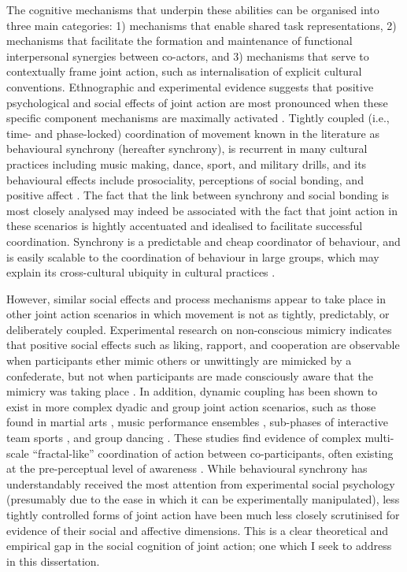 \begin{CJK}{UTF8}{gbsn}
{The cognitive mechanisms that underpin these abilities can be organised into three main categories: 1) mechanisms that enable shared task representations, 2) mechanisms that facilitate the formation and maintenance of functional interpersonal synergies between co-actors, and 3) mechanisms that serve to contextually frame joint action, such as internalisation of explicit cultural conventions\citep{Sebanz2006,Vesper2017}.  Ethnographic and experimental evidence suggests that positive psychological and social effects of joint action are most pronounced when these specific component mechanisms are maximally activated \citep{Durkheim1965,McNeill1995,Mogan2017}.  Tightly coupled (i.e., time- and phase-locked) coordination of movement known in the literature as behavioural synchrony (hereafter synchrony), is recurrent in many cultural practices including music making, dance, sport, and military drills, and its behavioural effects include prosociality, perceptions of social bonding, and positive affect \citep{Mogan2017}.  The fact that the link between synchrony and social bonding is most closely analysed may indeed be associated with the fact that joint action in these scenarios is hightly accentuated and idealised to facilitate successful coordination.  Synchrony is a predictable and cheap coordinator of behaviour, and is easily scalable to the coordination of behaviour in large groups, which may explain its cross-cultural ubiquity in cultural practices \citep{Dunbar2010,Tarr2016}.

However, similar social effects and process mechanisms appear to take place in other joint action scenarios in which movement is not as tightly, predictably, or deliberately coupled.  Experimental research on non-conscious mimicry indicates that positive social effects such as liking, rapport, and cooperation are observable when participants ether mimic others or unwittingly are mimicked by a confederate, but not when participants are made consciously aware that the mimicry was taking place \citep{Bos2008,Lakin2008}.  In addition, dynamic coupling has been shown to exist in more complex dyadic and group joint action scenarios, such as those found in martial arts \citep{Schmidt2011}, music performance ensembles \citep{Demos2014}, sub-phases of interactive team sports \citep{Duarte2013}, and group dancing \citep{Chauvigne2017}. These studies find evidence of complex multi-scale ``fractal-like'' coordination of action between co-participants, often existing at the pre-perceptual level of awareness \citep{Schmidt2011,Riley2011,Fusaroli2013}. While behavioural synchrony has understandably received the most attention from experimental social psychology (presumably due to the ease in which it can be experimentally manipulated), less tightly controlled forms of joint action have been much less closely scrutinised for evidence of their social and affective dimensions\citep[but see]{Marsh2009,Miles2009}.  This is a clear theoretical and empirical gap in the social cognition of joint action; one which I seek to address in this dissertation.

}
\end{CJK}
